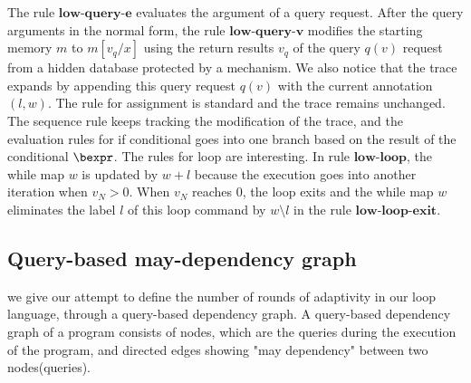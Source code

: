 The rule $\textbf{low-query-e}$ evaluates the argument of a query request. After the query arguments in the normal form, the rule $\textbf{low-query-v}$ modifies the starting memory $m$ to $m[v_q/x]$ using the return results $v_q$ of the query $q(v)$ request from a hidden database protected by a mechanism. We also notice that the trace expands by appending this query request $q(v)$ with the current annotation $(l,w)$. The rule for assignment is standard and the trace remains unchanged. The sequence rule keeps tracking the modification of the trace, and the evaluation rules for if conditional goes into one branch based on the result of the conditional $\bexpr$. The rules for loop are interesting. In rule $\textbf{low-loop}$, the while map $w$ is updated by $w + l$ because the execution goes into another iteration when $v_N >0$. When $v_N$ reaches $0$, the loop exits and the while map $w$ eliminates the label $l$ of this loop command by $w \setminus l$ in the rule $\textbf{low-loop-exit}$.     


\subsection{ Query-based may-dependency graph}
we give our attempt to define the number of rounds of adaptivity in our loop language, through a query-based dependency graph. A query-based dependency graph of a program consists of nodes, which are the queries during the execution of the program, and directed edges showing "may dependency" between two nodes(queries).


